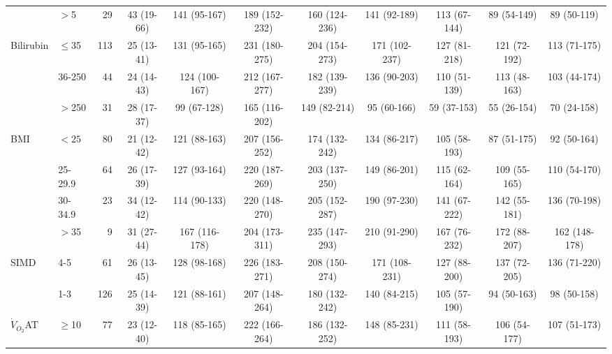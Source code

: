 \begin{sidewaystable}[p]
\begin{tabular}{|llr | cccccccc|}
		                    & $>$5      &  29 & 43 (19-66) & 141 (95-167)  & 189 (152-232) & 160 (124-236) & 141 (92-189)  & 113 (67-144)  & 89 (54-149)  &  89 (50-119)  \\
		Bilirubin           & $\leq$35  & 113 & 25 (13-41) & 131 (95-165)  & 231 (180-275) & 204 (154-273) & 171 (102-237) & 127 (81-218)  & 121 (72-192) & 113 (71-175)  \\
		                    & 36-250    &  44 & 24 (14-43) & 124 (100-167) & 212 (167-277) & 182 (139-239) & 136 (90-203)  & 110 (51-139)  & 113 (48-163) & 103 (44-174)  \\
		                    & $>$250    &  31 & 28 (17-37) &  99 (67-128)  & 165 (116-202) & 149 (82-214)  &  95 (60-166)  &  59 (37-153)  & 55 (26-154)  &  70 (24-158)  \\
		BMI                 & $<25$     &  80 & 21 (12-42) & 121 (88-163)  & 207 (156-252) & 174 (132-242) & 134 (86-217)  & 105 (58-193)  & 87 (51-175)  &  92 (50-164)  \\
		                    & 25-29.9   &  64 & 26 (17-39) & 127 (93-164)  & 220 (187-269) & 203 (137-250) & 149 (86-201)  & 115 (62-164)  & 109 (55-165) & 110 (54-170)  \\
		                    & 30-34.9   &  23 & 34 (12-42) & 114 (90-133)  & 220 (148-270) & 205 (152-287) & 190 (97-230)  & 141 (67-222)  & 142 (55-181) & 136 (70-198)  \\
		                    & $>$35     &   9 & 31 (27-44) & 167 (116-178) & 204 (173-311) & 235 (147-293) & 210 (91-290)  & 167 (76-232)  & 172 (88-207) & 162 (148-178) \\
		SIMD                & 4-5       &  61 & 26 (13-45) & 128 (98-168)  & 226 (183-271) & 208 (150-274) & 171 (108-231) & 127 (88-200)  & 137 (72-205) & 136 (71-220)  \\
		                    & 1-3       & 126 & 25 (14-39) & 121 (88-161)  & 207 (148-264) & 180 (132-242) & 140 (84-215)  & 105 (57-190)  & 94 (50-163)  &  98 (50-158)  \\
		$\dot{V}_{O_2}$AT   & $\geq$10  &  77 & 23 (12-40) & 118 (85-165)  & 222 (166-264) & 186 (132-252) & 148 (85-231)  & 111 (58-193)  & 106 (54-177) & 107 (51-173)  \\

\end{tabular}
\end{sidewaystable}
